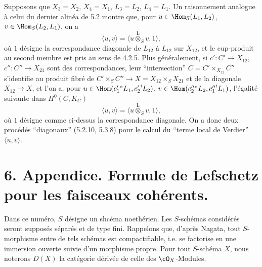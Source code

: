 Supposons que $X_3=X_2$, $X_4=X_1$, $L_3=L_2$, $L_4=L_1$. Un raisonnement analogue à celui du dernier alinéa de 5.2 montre que, pour $u\in\Hom_S(L_1,L_2)$, $v\in\Hom_S(L_2,L_1)$, on a
\begin{equation}
\tag{5.3.7}
\langle u,v\rangle=\langle u\overset{\mathrm{L}}{\otimes}_Sv,1\rangle,
\end{equation}
où $1$ désigne la correspondance diagonale de $L_{12}$ à $L_{12}$ sur $X_{12}$, et le cup-produit au second membre est pris au sens de 4.2.5. Plus généralement, si $c':C'\to X_{12}$, $c'':C''\to X_{21}$ sont des correspondances, leur ``intersection'' $C=C'\times_{X_{12}}C''$ s'identifie au produit fibré de $C'\times_SC''\to X=X_{12}\times_SX_{21}$ et de la diagonale $X_{12}\to X$, et l'on a, pour $u\in\Hom(c_1'{}^*L_1,c_2'{}^!L_2)$, $v\in\Hom(c_2''{}^*L_2,c_1''{}^!L_1)$, l'égalité suivante dans $H^0(C,K_C)$
\begin{equation}
\tag{5.3.8}
\langle u,v\rangle=\langle u\overset{\mathrm{L}}{\otimes}_Sv,1\rangle,
\end{equation}
où $1$ désigne comme ci-dessus la correspondance diagonale. On a donc deux procédés ``diagonaux'' (5.2.10, 5.3.8) pour le calcul du ``terme local de Verdier'' $\langle u,v\rangle$.

\section*{6. Appendice. Formule de Lefschetz pour les faisceaux cohérents.}

Dans ce numéro, $S$ désigne un shcéma noethérien. Les $S$-schémas considérés seront supposés séparés et de type fini. Rappelons que, d'après Nagata, tout $S$-morphisme entre de tels schémas est compactifiable, i.e. se factorise en une immersion ouverte suivie d'un morphisme propre. Pour tout $S$-schéma $X$, nous noterons $D(X)$ la catégorie dérivée de celle des $\cO_X$-Modules.

